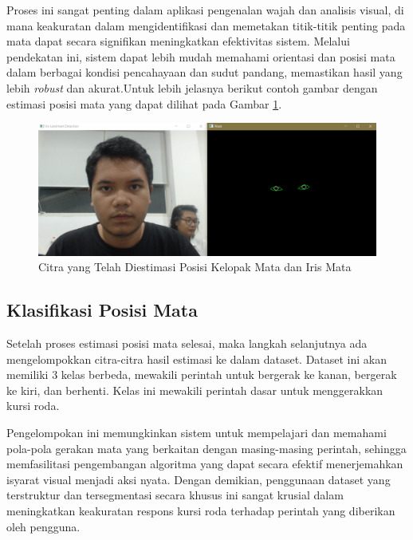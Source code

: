 Proses ini sangat penting dalam aplikasi pengenalan wajah dan analisis visual, di mana keakuratan dalam mengidentifikasi dan memetakan titik-titik penting pada mata dapat secara signifikan meningkatkan efektivitas sistem. Melalui pendekatan ini, sistem dapat lebih mudah memahami orientasi dan posisi mata dalam berbagai kondisi pencahayaan dan sudut pandang, memastikan hasil yang lebih \emph{robust} dan akurat.Untuk lebih jelasnya berikut contoh gambar dengan estimasi posisi mata yang dapat dilihat pada Gambar \ref{fig:contoh citra yang telah diestimasi pose}. 

\begin{figure} [ht] \centering
    \includegraphics[scale=0.35]{gambar/bab3/iris.png}
    \caption{Citra yang Telah Diestimasi Posisi Kelopak Mata dan Iris Mata}
    \label{fig:contoh citra yang telah diestimasi pose}
\end{figure}


\subsection{Klasifikasi Posisi Mata}
Setelah proses estimasi posisi mata selesai, maka langkah selanjutnya ada mengelompokkan citra-citra hasil estimasi ke dalam dataset. Dataset ini akan memiliki 3 kelas berbeda, mewakili perintah untuk bergerak ke kanan, bergerak ke kiri, dan berhenti. Kelas ini mewakili perintah dasar untuk menggerakkan kursi roda. 

Pengelompokan ini memungkinkan sistem untuk mempelajari dan memahami pola-pola gerakan mata yang berkaitan dengan masing-masing perintah, sehingga memfasilitasi pengembangan algoritma yang dapat secara efektif menerjemahkan isyarat visual menjadi aksi nyata. Dengan demikian, penggunaan dataset yang terstruktur dan tersegmentasi secara khusus ini sangat krusial dalam meningkatkan keakuratan respons kursi roda terhadap perintah yang diberikan oleh pengguna.

